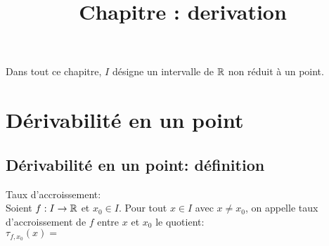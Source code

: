 \documentclass[a4paper, 11pt]{article}
\begin{document}
\tableofcontents
\title{Chapitre : derivation}
\vspace{0.5cm}





\noindent Dans tout ce chapitre, $I$ d\'esigne un intervalle de $ \mathbb{R}$ non r\'eduit \`a un point.


\section{D\'erivabilit\'e en un point}


\subsection{D\'erivabilit\'e en un point: d\'efinition}

{\noindent

	\begin{defi} Taux d'accroissement:\\
		\noindent Soient $f: I\rightarrow \mathbb{R}$ et $x_0\in I$. Pour tout $x\in I$ avec $x\not= x_0$, on appelle taux d'accroissement de $f$ entre $x$ et $x_0$ le quotient:\vsec\\
		\noindent $\tau_{f,x_0}(x)=$\dotfill \phantom{   \hspace{7cm}  }\vsec
	\end{defi}

}

\vspace{0.3cm}
\end{document}
